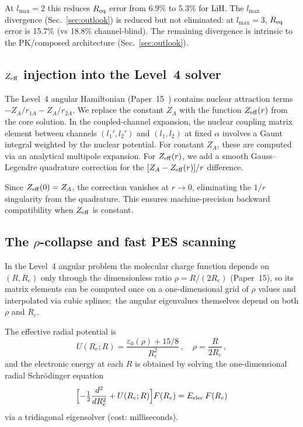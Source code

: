 \documentclass[aps,pra,twocolumn,superscriptaddress,longbibliography,floatfix]{revtex4-2}
\begin{document}
At $l_{\max} = 2$ this reduces $R_{\rm eq}$ error from 6.9\% to
5.3\% for LiH.  The $l_{\max}$ divergence (Sec.~\ref{sec:outlook})
is reduced but not eliminated: at $l_{\max} = 3$, $R_{\rm eq}$
error is 15.7\% (vs 18.8\% channel-blind).  The remaining divergence
is intrinsic to the PK/composed architecture (Sec.~\ref{sec:outlook}).


\subsection{\texorpdfstring{$Z_{\rm eff}$}{Z\_eff} injection into the
Level~4 solver}
\label{sec:injection}

The Level~4 angular Hamiltonian (Paper~15~\cite{paper15}) contains
nuclear attraction terms $-Z_A/r_{1A} - Z_A/r_{2A}$.  We replace
the constant $Z_A$ with the function $Z_{\rm eff}(r)$ from the core
solution.  In the coupled-channel expansion, the nuclear coupling
matrix element between channels $(l_1', l_2')$ and $(l_1, l_2)$ at
fixed $\alpha$ involves a Gaunt integral weighted by the nuclear
potential.  For constant $Z_A$, these are computed via an analytical
multipole expansion.  For $Z_{\rm eff}(r)$, we add a smooth
Gauss--Legendre quadrature correction for the
$[Z_A - Z_{\rm eff}(r)]/r$ difference.

Since $Z_{\rm eff}(0) = Z_A$, the correction vanishes at $r \to 0$,
eliminating the $1/r$ singularity from the quadrature.  This ensures
machine-precision backward compatibility when $Z_{\rm eff}$ is
constant.


\subsection{The \texorpdfstring{$\rho$}{rho}-collapse and fast PES
scanning}
\label{sec:rho_collapse}

In the Level~4 angular problem the molecular charge function depends
on $(R, R_e)$ only through the dimensionless ratio
$\rho = R/(2R_e)$ (Paper~15), so its matrix elements can be computed
once on a one-dimensional grid of $\rho$ values and interpolated via
cubic splines;\ the angular eigenvalues themselves depend on both $\rho$
and $R_e$.

The effective radial potential is
\begin{equation}
  U(R_e; R) = \frac{\varepsilon_0(\rho) + 15/8}{R_e^2}\,,
  \quad \rho = \frac{R}{2R_e}\,,
  \label{eq:U_eff}
\end{equation}
and the electronic energy at each $R$ is obtained by solving the
one-dimensional radial Schr\"odinger equation
\begin{equation}
  \Bigl[-\tfrac{1}{2}\frac{d^2}{dR_e^2} + U(R_e; R)\Bigr]
    F(R_e) = E_{\rm elec}\,F(R_e)
  \label{eq:radial}
\end{equation}
via a tridiagonal eigensolver (cost: milliseconds).
\end{document}
